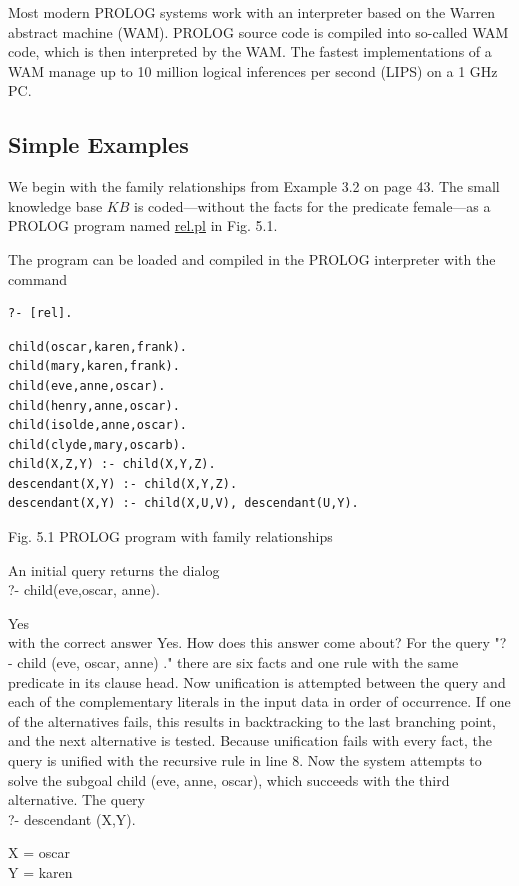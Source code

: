 \documentclass[10pt]{book}
\begin{document}
Most modern PROLOG systems work with an interpreter based on the Warren abstract machine (WAM). PROLOG source code is compiled into so-called WAM code, which is then interpreted by the WAM. The fastest implementations of a WAM manage up to 10 million logical inferences per second (LIPS) on a 1 GHz PC.

\subsection{Simple Examples}
We begin with the family relationships from Example 3.2 on page 43. The small knowledge base $K B$ is coded—without the facts for the predicate female—as a PROLOG program named \href{http://rel.pl}{rel.pl} in Fig. 5.1.

The program can be loaded and compiled in the PROLOG interpreter with the command
\begin{verbatim}
?- [rel].
\end{verbatim}

\begin{verbatim}
child(oscar,karen,frank).
child(mary,karen,frank).
child(eve,anne,oscar).
child(henry,anne,oscar).
child(isolde,anne,oscar).
child(clyde,mary,oscarb).
child(X,Z,Y) :- child(X,Y,Z).
descendant(X,Y) :- child(X,Y,Z).
descendant(X,Y) :- child(X,U,V), descendant(U,Y).
\end{verbatim}

Fig. 5.1 PROLOG program with family relationships

An initial query returns the dialog\\
?- child(eve,oscar, anne).

Yes\\
with the correct answer Yes. How does this answer come about? For the query "? - child (eve, oscar, anne) ." there are six facts and one rule with the same predicate in its clause head. Now unification is attempted between the query and each of the complementary literals in the input data in order of occurrence. If one of the alternatives fails, this results in backtracking to the last branching point, and the next alternative is tested. Because unification fails with every fact, the query is unified with the recursive rule in line 8. Now the system attempts to solve the subgoal child (eve, anne, oscar), which succeeds with the third alternative. The query\\
?- descendant (X,Y).

X = oscar\\
Y = karen
\end{document}
